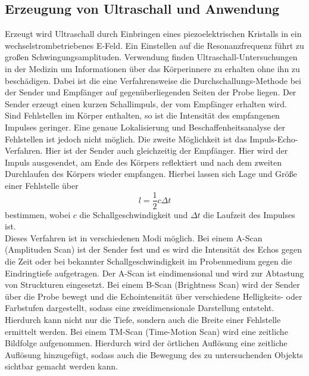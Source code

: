 \subsection{Erzeugung von Ultraschall und Anwendung}
Erzeugt wird Ultraschall durch Einbringen eines piezoelektrischen Kristalls in ein wechselstrombetriebenes E-Feld. Ein Einstellen auf die Resonanzfrequenz führt zu großen Schwingungsamplituden.\newline
Verwendung finden Ultraschall-Untersuchungen in der Medizin um Informationen über das Körperinnere zu erhalten ohne ihn zu beschädigen.\newline
Dabei ist die eine Verfahrensweise die Durchschallungs-Methode bei der Sender und Empfänger auf gegenüberliegenden Seiten der Probe liegen. Der Sender erzeugt einen kurzen Schallimpuls, der vom Empfänger erhalten wird. Sind Fehlstellen im Körper enthalten, so ist die Intensität des empfangenen Impulses geringer. Eine genaue Lokalisierung und Beschaffenheitsanalyse der Fehlstellen ist jedoch nicht möglich.\newline
Die zweite Möglichkeit ist das Impuls-Echo-Verfahren.
Hier ist der Sender auch gleichzeitig der Empfänger. Hier wird der Impuls ausgesendet, am Ende des Körpers reflektiert und nach dem zweiten Durchlaufen des Körpers wieder empfangen.
Hierbei lassen sich Lage und Größe einer Fehlstelle über 
\begin{equation}
l=\frac{1}{2}c \Delta t\label{eq:l}
\end{equation}
bestimmen, wobei $c$ die Schallgeschwindigkeit und $\Delta t$ die Laufzeit des Impulses ist.\\ Dieses Verfahren ist in verschiedenen Modi möglich.
Bei einem A-Scan (Amplituden Scan) ist der Sender fest und es wird die Intensität des Echos gegen die Zeit oder bei bekannter Schallgeschwindigkeit im Probenmedium gegen die Eindringtiefe aufgetragen. Der A-Scan ist eindimensional und wird zur Abtastung von Struckturen eingesetzt.
Bei einem B-Scan (Brightness Scan) wird der Sender über die Probe bewegt und die Echointensität über verschiedene Helligkeits- oder Farbstufen dargestellt, sodass eine zweidimensionale Darstellung entsteht. Hierdurch kann nicht nur die Tiefe, sondern auch die Breite einer Fehlstelle ermittelt werden.
Bei einem TM-Scan (Time-Motion Scan) wird eine zeitliche Bildfolge aufgenommen. Hierdurch wird der örtlichen Auflösung eine zeitliche Auflösung hinzugefügt, sodass auch die Bewegung des zu untersuchenden Objekts sichtbar gemacht werden kann.
